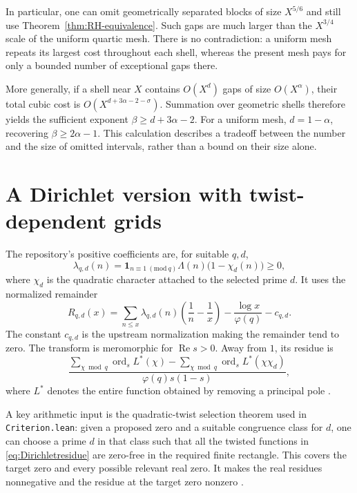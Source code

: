 \documentclass[11pt,a4paper]{article}
\theoremstyle{definition}
\theoremstyle{remark}
\numberwithin{equation}{section}
\newcommand{\Rea}{\operatorname{Re}}
\begin{document}
In particular, one can omit geometrically separated blocks of size
\(X^{5/6}\) and still use Theorem~\ref{thm:RH-equivalence}. Such gaps
are much larger than the \(X^{3/4}\) scale of the uniform quartic
mesh. There is no contradiction: a uniform mesh repeats its largest
cost throughout each shell, whereas the present mesh pays for only a
bounded number of exceptional gaps there.

More generally, if a shell near \(X\) contains
\(O(X^d)\) gaps of size \(O(X^\alpha)\), their total cubic cost is
\(O(X^{d+3\alpha-2-\sigma})\). Summation over geometric shells
therefore yields the sufficient exponent \(\beta\geq d+3\alpha-2\).
For a uniform mesh, \(d=1-\alpha\), recovering
\(\beta\geq2\alpha-1\). This calculation describes a tradeoff
between the number and the size of omitted intervals, rather than a
bound on their size alone.

\section{A Dirichlet version with twist-dependent grids}
\label{sec:Dirichlet}

The repository's positive coefficients are, for suitable \(q,d\),
\[
 \lambda_{q,d}(n)=\mathbf1_{n\equiv1\ (\mathrm{mod}\ q)}
                  \Lambda(n)\bigl(1-\chi_d(n)\bigr)\geq0,
\]
where \(\chi_d\) is the quadratic character attached to the selected
prime \(d\). It uses the normalized remainder
\begin{equation}
 R_{q,d}(x)=\sum_{n\leq x}\lambda_{q,d}(n)
       \left(\frac1n-\frac1x\right)
       -\frac{\log x}{\varphi(q)}-c_{q,d}.
 \label{eq:Dirichletremainder}
\end{equation}
The constant \(c_{q,d}\) is the upstream normalization making the
remainder tend to zero. The transform is meromorphic for \(\Rea s>0\).
Away from \(1\), its residue is
\begin{equation}
 \frac{\displaystyle\sum_{\chi\bmod q}
       \operatorname{ord}_s L^*(\chi)
       -\displaystyle\sum_{\chi\bmod q}
       \operatorname{ord}_s L^*(\chi\chi_d)}
      {\varphi(q)s(1-s)},
 \label{eq:Dirichletresidue}
\end{equation}
where \(L^*\) denotes the entire function obtained by removing a
principal pole \cite{primeerror}.

A key arithmetic input is the quadratic-twist selection theorem used
in \texttt{Criterion.lean}: given a proposed zero and a suitable
congruence class for \(d\), one can choose a prime \(d\) in that
class such that all the twisted functions in
\eqref{eq:Dirichletresidue} are zero-free in the required finite
rectangle. This covers the target zero and every possible relevant
real zero. It makes the real residues nonnegative and the residue at
the target zero nonzero \cite{criterion}.
\end{document}

